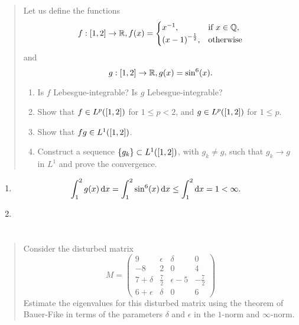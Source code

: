 \documentclass{exercise}
\begin{document}
	\begin{quote}
		Let us define the functions
		\[
			f: \brackets*{1, 2} \to \R, f\parentheses*{x} = \begin{cases}
				x^{-1}, & \text{if }x \in \Q,\\
				\parentheses*{x - 1}^{-\frac{1}{2}}, & \text{otherwise}
			\end{cases}
		\]
		and
		\[
			g: \brackets*{1, 2} \to \R, g\parentheses*{x} = \sin^6\parentheses*{x}.
		\]
		\begin{enumerate}
			\item Is \(f\) Lebesgue-integrable?
			Is \(g\) Lebesgue-integrable?
			\item Show that \(f \in L^p\parentheses*{\brackets*{1, 2}}\) for \(1 \le p < 2\), and \(g \in L^p\parentheses*{\brackets*{1, 2}}\) for \(1 \le p\).
			\item Show that \(fg \in L^1\parentheses*{\brackets*{1, 2}}\).
			\item Construct a sequence \(\braces*{g_k} \subset L^1\parentheses*{\brackets*{1, 2}}\), with \(g_k \ne g\), such that \(g_k \to g\) in \(L^1\) and prove the convergence.
		\end{enumerate}
	\end{quote}

	\begin{enumerate}
		\item
		\[
			\int_1^2 g\parentheses*{x}\d x = \int_1^2 \sin^6 \parentheses*{x}\d x \le \int_1^2 \d x = 1 < \infty.
		\]
		\item 
	\end{enumerate}


	\section{}

	\begin{quote}
		Consider the disturbed matrix
		\[
			M = \begin{pmatrix}
				9 & \epsilon & \delta & 0\\
				-8 & 2 & 0 & 4\\
				7 + \delta & \frac{7}{2} & \epsilon - 5 & -\frac{7}{2}\\
				6 + \epsilon & \delta & 0 & 6
			\end{pmatrix}
		\]
		Estimate the eigenvalues for this disturbed matrix using the theorem of Bauer-Fike in terms of the parameters \(\delta\) and \(\epsilon\) in the \(1\)-norm and \(\infty\)-norm.
	\end{quote}
\end{document}
